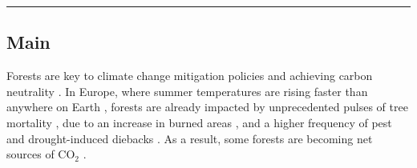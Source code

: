 \documentclass[11pt,letter]{article}
\begin{document}

\noindent\rule{\textwidth}{0.3pt}

\linenumbers

\subsection*{Main}

Forests are key to climate change mitigation policies and achieving carbon neutrality  \citep{Korosuo2023, Hyyrynen2023}. In Europe, where summer temperatures are rising faster than anywhere on Earth \citep{CCCS2024}, forests are already impacted by unprecedented pulses of tree mortality \citep{Senf2020}, due to an increase in burned areas \citep{Carnicer2022, Kelly2024}, and a higher frequency of pest and drought-induced diebacks \citep{Karelin2021, Cienciala2024, Latifovic2024}. As a result, some forests are becoming net sources of CO$_2$ \citep{Hadden2016, Karelin2021}. 
\end{document}
